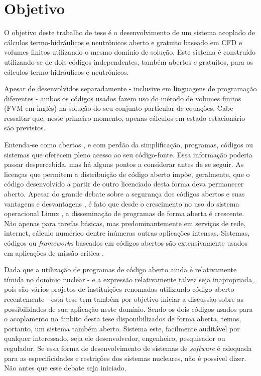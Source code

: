 \section{Objetivo}

O objetivo deste trabalho de tese é o desenvolvimento de um sistema acoplado de cálculos
termo-hidráulicos e neutrônicos aberto e gratuito baseado em CFD e volumes finitos utilizando
o mesmo domínio de solução. Este sistema é construído utilizando-se de dois códigos independentes, também
abertos e gratuitos, para os cálculos termo-hidráulicos e neutrônicos. 

Apesar de desenvolvidos separadamente - inclusive
em linguagens de programação diferentes - ambos os códigos usados fazem uso do método de volumes
finitos \cite{Eymard2003} (FVM em inglês) na solução do seu conjunto particular de equações.
Cabe ressaltar que, neste primeiro momento, apenas cálculos em estado estacionário
são previstos.

Entenda-se como abertos \cite[Capítulo~3]{Stallman2002}, e com perdão da simplificação, programas, códigos ou sistemas
que oferecem pleno acesso ao seu código-fonte. Essa informação poderia passar despercebida,
mas há alguns pontos a considerar antes de se
seguir. As licenças que permitem a distribuição de código aberto impõe, geralmente, que
o código desenvolvido a partir de outro licenciado desta forma deva permanecer aberto.
Apesar do grande debate sobre a segurança dos códigos abertos e suas vantagens e desvantagens \cite[Seção~2.6]{Androutsellis2010},
é fato que desde o crescimento no uso do sistema operacional Linux \cite{LinuxBritannica}, a disseminação de programas de forma aberta é crescente.
Não apenas para tarefas básicas, mas predominantemente em serviços de rede, internet, cálculo numérico dentre
inúmeras outras aplicações intensas. Sistemas, códigos ou \textit{frameworks} baseados em códigos abertos são
extensivamente usados em aplicações de missão crítica \cite{Norris2004}.

Dada que a utilização de programas de código aberto ainda é relativamente tímida no domínio nuclear
- e a expressão relativamente talvez seja inapropriada, pois são vários projetos de instituições
renomadas utilizando código aberto recentemente \cite{Romano2013, Boyd2014, Huff2016} -
esta tese tem também por objetivo iniciar a discussão sobre as possibilidades de sua
aplicação neste domínio. Sendo os dois códigos usados para o acoplamento no âmbito desta tese disponibilizados
de forma aberta, temos, portanto, um sistema também aberto. Sistema este, facilmente auditável
por qualquer interessado, seja ele desenvolvedor, engenheiro, pesquisador ou regulador.
Se essa forma de desenvolvimento de sistemas de \textit{software} é adequada para as especificidades
e restrições dos sistemas nucleares, não é possível dizer. Não antes que esse debate
seja iniciado.

